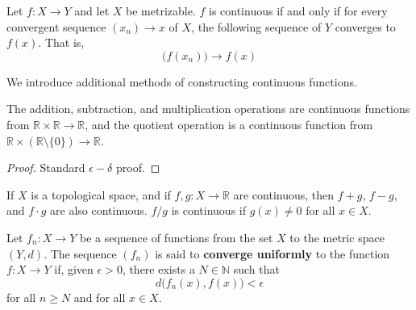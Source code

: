 \documentclass{article}
\begin{document}
    \begin{theorem}
    Let $f: X \longrightarrow Y$ and let $X$ be metrizable. $f$ is continuous if and only if for every convergent sequence $(x_n) \rightarrow x$ of $X$, the following sequence of $Y$ converges to $f(x)$. That is, 
    \[\big( f(x_n) \big) \longrightarrow f(x)\]
    \end{theorem}

    We introduce additional methods of constructing continuous functions. 

    \begin{lemma}
    The addition, subtraction, and multiplication operations are continuous functions from $\mathbb{R} \times \mathbb{R} \longrightarrow \mathbb{R}$, and the quotient operation is a continuous function from $\mathbb{R} \times (\mathbb{R} \setminus \{0\}) \longrightarrow \mathbb{R}$. 
    \end{lemma}
    \begin{proof}
    Standard $\epsilon-\delta$ proof. 
    \end{proof}

    \begin{theorem}
    If $X$ is a topological space, and if $f, g: X \longrightarrow \mathbb{R}$ are continuous, then $f + g$, $f-g$, and $f \cdot g$ are also continuous. $f / g$ is continuous if $g(x) \neq 0$ for all $x \in X$. 
    \end{theorem}

    \begin{definition}
    Let $f_n: X \longrightarrow Y$ be a sequence of functions from the set $X$ to the metric space $(Y, d)$. The sequence $(f_n)$ is said to \textbf{converge uniformly} to the function $f: X \longrightarrow Y$ if, given $\epsilon > 0$, there exists a $N \in \mathbb{N}$ such that
    \[d\big( f_n(x), f(x)\big) < \epsilon\]
    for all $n \geq N$ and for all $x \in X$. 
    \end{definition}
\end{document}

